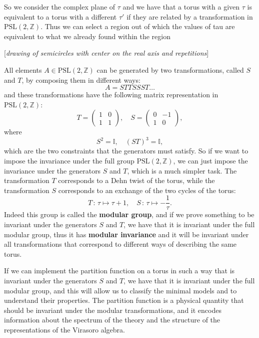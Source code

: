 So we consider the complex plane of \(\tau\) and we have that a torus with a given \(\tau\) is equivalent to a torus with a different \(\tau'\) if they are related by a transformation in \(\mathrm{PSL}(2, \mathbb{Z})\). Thus we can select a region out of which the values of tau are equivalent to what we already found within the region

    [\textit{drawing of semicircles with center on the real axis and repetitions}]

All elements \(A \in \mathrm{PSL}(2, \mathbb{Z})\) can be generated by two transformations, called \(S\) and \(T\), by composing them in different ways:
\[
    A = S T T S S S T\dots
\]
and these transformations have the following matrix representation in \(\mathrm{PSL}(2, \mathbb{Z})\):
\[
    T = \begin{pmatrix}
        1 & 0 \\
        1 & 1
    \end{pmatrix}, \quad S = \begin{pmatrix}
        0 & -1 \\
        1 & 0
    \end{pmatrix},
\]
where
\[
    S^2 = \mathbb{I}, \quad (ST)^3 = \mathbb{I},
\]
which are the two constraints that the generators must satisfy. So if we want to impose the invariance under the full group \(\mathrm{PSL}(2, \mathbb{Z})\), we can just impose the invariance under the generators \(S\) and \(T\), which is a much simpler task. The transformation \(T\) corresponds to a Dehn twist of the torus, while the transformation \(S\) corresponds to an exchange of the two cycles of the torus:
\[
    T \,:\, \tau \mapsto \tau + 1, \quad S \,:\, \tau \mapsto -\frac{1}{\tau}.
\]
Indeed this group is called the \textbf{modular group}, and if we prove something to be invariant under the generators \(S\) and \(T\), we have that it is invariant under the full modular group, thus it has \textbf{modular invariance} and it will be invariant under all transformations that correspond to different ways of describing the same torus.

If we can implement the partition function on a torus in such a way that is invariant under the generators \(S\) and \(T\), we have that it is invariant under the full modular group, and this will allow us to classify the minimal models and to understand their properties. The partition function is a physical quantity that should be invariant under the modular transformations, and it encodes information about the spectrum of the theory and the structure of the representations of the Virasoro algebra.

